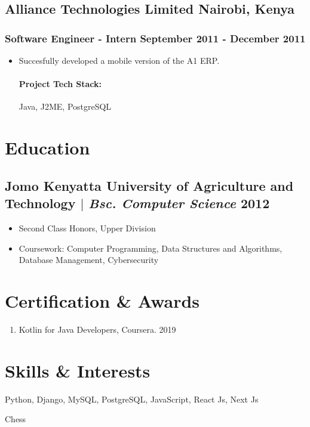 \documentclass[11pt]{article} %
\begin{document}
\subsection{Alliance Technologies Limited \hfill Nairobi, Kenya}
\subsubsection{Software Engineer - Intern \hfill  September 2011 - December 2011}
\begin{itemize}
    \item Succesfully developed a mobile version of the A1 ERP. 
    \paragraph{Project Tech Stack:} Java, J2ME, PostgreSQL
\end{itemize}

\section{Education}
\subsection{Jomo Kenyatta University of Agriculture and Technology $|$ {\normalfont\itshape Bsc. Computer Science} \hfill 2012}
\begin{itemize}
    \item Second Class Honors, Upper Division
    \item Coursework: Computer Programming, Data Structures and Algorithms, Database Management, Cybersecurity
\end{itemize}


\section{Certification \& Awards}
\begin{enumerate}[label=\null, left=0pt..0pt, itemsep=0pt]
        \item Kotlin for Java Developers, Coursera. \hfill 2019
\end{enumerate}

\section{Skills \& Interests}
\begin{description}[itemsep=0pt]
        \item[Technical] Python, Django, MySQL, PostgreSQL, JavaScript, React Js, Next Js 
        \item[Interests] Chess
\end{description}
\end{document}
